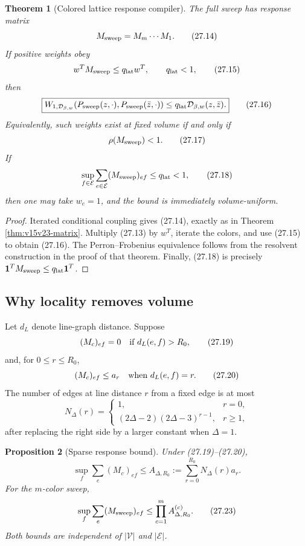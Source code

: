 \documentclass[11pt]{article}
\newtheorem{theorem}{Theorem}[section]
\newtheorem{proposition}[theorem]{Proposition}
\theoremstyle{remark}
\begin{document}
\begin{theorem}[Colored lattice response compiler]
\label{thm:v15v27-compiler}
The full sweep has response matrix
\[
 M_{\rm sweep}=M_m\cdots M_1.                              \tag{27.14}
\]
If positive weights obey
\[
 w^TM_{\rm sweep}\le q_{\rm lat}w^T,\qquad q_{\rm lat}<1,  \tag{27.15}
\]
then
\[
 \boxed{
 W_{1,{\cal D}_{\beta,w}}
 (P_{\rm sweep}(z,\cdot),P_{\rm sweep}(\bar z,\cdot))
 \le q_{\rm lat}{\cal D}_{\beta,w}(z,\bar z).}             \tag{27.16}
\]
Equivalently, such weights exist at fixed volume if and only if
\[
 \rho(M_{\rm sweep})<1.                                    \tag{27.17}
\]
If
\[
 \sup_{f\in\mathcal E}\sum_{e\in\mathcal E}
 (M_{\rm sweep})_{ef}\le q_{\rm lat}<1,                    \tag{27.18}
\]
then one may take \(w_e=1\), and the bound is immediately
volume-uniform.
\end{theorem}

\begin{proof}
Iterated conditional coupling gives (27.14), exactly as in Theorem
\ref{thm:v15v23-matrix}.  Multiply (27.13) by \(w^T\), iterate the
colors, and use (27.15) to obtain (27.16).  The
Perron--Frobenius equivalence follows from the resolvent construction
in the proof of that theorem.  Finally, (27.18) is precisely
\({\bf 1}^TM_{\rm sweep}\le q_{\rm lat}{\bf 1}^T\).
\end{proof}

\subsection{Why locality removes volume}

Let \(d_L\) denote line-graph distance.  Suppose
\[
 (M_c)_{ef}=0\quad\hbox{if }d_L(e,f)>R_0,                  \tag{27.19}
\]
and, for \(0\le r\le R_0\),
\[
 (M_c)_{ef}\le a_r
 \quad\hbox{when }d_L(e,f)=r.                              \tag{27.20}
\]
The number of edges at line distance \(r\) from a fixed edge is at
most
\[
 N_\Delta(r)
 =
 \begin{cases}
 1,&r=0,\\
 (2\Delta-2)(2\Delta-3)^{r-1},&r\ge1,
 \end{cases}                                                \tag{27.21}
\]
after replacing the right side by a larger constant when
\(\Delta=1\).

\begin{proposition}[Sparse response bound]
\label{prop:v15v27-sparse}
Under (27.19)--(27.20),
\[
 \sup_f\sum_e(M_c)_{ef}
 \le
 A_{\Delta,R_0}:=
 \sum_{r=0}^{R_0}N_\Delta(r)a_r.                           \tag{27.22}
\]
For the \(m\)-color sweep,
\[
 \sup_f\sum_e(M_{\rm sweep})_{ef}
 \le\prod_{c=1}^m A_{\Delta,R_0}^{(c)}.                    \tag{27.23}
\]
Both bounds are independent of
\(|\mathcal V|\) and \(|\mathcal E|\).
\end{proposition}
\end{document}
